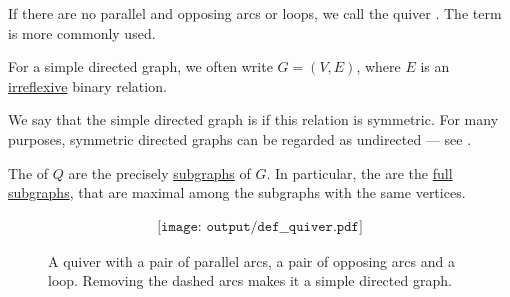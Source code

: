 \begin{definition}
\begin{thmenum}
     If there are no parallel and opposing arcs or loops, we call the quiver . The term  is more commonly used.

    For a simple directed graph, we often write \( G = (V, E) \), where \( E \) is an \hyperref[def:binary_relation/irreflexive]{irreflexive} binary relation.

    We say that the simple directed graph is  if this relation is symmetric. For many purposes, symmetric directed graphs can be regarded as undirected --- see .

     The  of \( Q \) are the precisely \hyperref[def:undirected_multigraph/submodel]{subgraphs} of \( G \). In particular, the  are the \hyperref[def:undirected_multigraph/submodel]{full subgraphs}, that are maximal among the subgraphs with the same vertices.
  \end{thmenum}

  \begin{figure}[!ht]
    \begin{equation}\label{eq:fig:def:quiver}
      \begin{aligned}
        \texttt{[image: output/def\_\_quiver.pdf]}
      \end{aligned}
    \end{equation}
    \caption{A quiver with a pair of parallel arcs, a pair of opposing arcs and a loop. Removing the dashed arcs makes it a simple directed graph.}\label{fig:def:quiver}
  \end{figure}
\end{definition}

